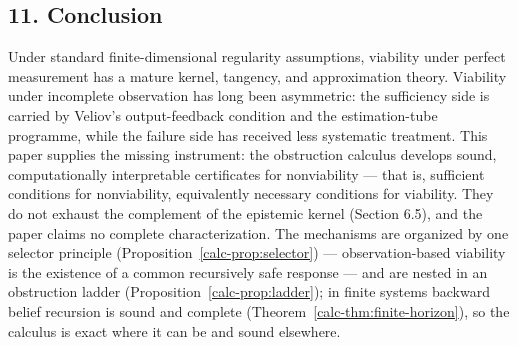 \documentclass[10pt,twocolumn]{article}
\theoremstyle{definition}
\begin{document}
\subsection{11. Conclusion}\label{calc-conclusion}

Under standard finite-dimensional regularity assumptions, viability under perfect measurement has a mature kernel, tangency, and approximation theory. Viability under incomplete observation has
long been asymmetric: the sufficiency side is carried by Veliov's
output-feedback condition and the estimation-tube programme, while the failure side has received less systematic treatment. This paper supplies the missing instrument: the obstruction calculus develops sound, computationally interpretable certificates for nonviability --- that is, sufficient conditions for nonviability, equivalently necessary conditions for viability. They do not exhaust the complement of the epistemic kernel (Section 6.5), and the paper claims no complete characterization. The mechanisms
are organized by one selector principle (Proposition~\ref{calc-prop:selector}) --- observation-based viability
is the existence of a common recursively safe response --- and are
nested in an obstruction ladder (Proposition~\ref{calc-prop:ladder}); in
finite systems backward belief recursion is sound and complete
(Theorem~\ref{calc-thm:finite-horizon}), so the calculus is exact where it
can be and sound elsewhere.
\end{document}

